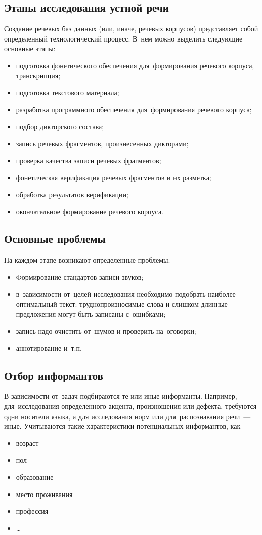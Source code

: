 \documentclass[12pt]{article}
\theoremstyle{definition}
\theoremstyle{remark}
\numberwithin{equation}{section}
\begin{document}
\subsection{Этапы исследования устной речи}
Создание речевых баз данных (или, иначе, речевых корпусов) представляет
собой определенный технологический процесс. В~нем можно выделить следующие
основные этапы:
\begin{itemize}
    \item подготовка фонетического обеспечения для~формирования речевого
    корпуса, транскрипция;
    \item подготовка текстового материала;
    \item разработка программного обеспечения для~формирования речевого
    корпуса;
    \item подбор дикторского состава;
    \item запись речевых фрагментов, произнесенных дикторами;
    \item проверка качества записи речевых фрагментов;
    \item фонетическая верификация речевых фрагментов и их разметка;
    \item обработка результатов верификации;
    \item окончательное формирование речевого корпуса.
\end{itemize}
\subsection{Основные проблемы}
На каждом этапе возникают определенные проблемы.
\begin{itemize}
    \item Формирование стандартов записи звуков;
    \item в~зависимости от~целей исследования необходимо подобрать
    наиболее оптимальный текст: труднопроизносимые слова и слишком длинные
    предложения могут быть записаны с~ошибками;
    \item запись надо очистить от~шумов и проверить на~оговорки;
    \item аннотирование и~т.п.
\end{itemize}

\subsection{Отбор информантов}
В зависимости от~задач подбираются те или иные информанты. Например,
для~исследования определенного акцента, произношения или дефекта,
требуются одни носители языка, а для исследования норм или для~распознавания
речи~--- иные. Учитываются такие характеристики потенциальных информантов, как
\begin{itemize}
	\item возраст
	\item пол
	\item образование
	\item место проживания
	\item профессия
	\item \dots
\end{itemize}
\end{document}
